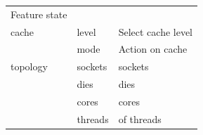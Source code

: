 \documentclass[
  14pt,
  english,
  a4paper,
]{scrreprt}
\begin{document}
\begin{longtable}[]{@{}lll@{}}
\begin{minipage}[t]{0.27\columnwidth}
Feature state\strut
\end{minipage}\tabularnewline
\begin{minipage}[t]{0.16\columnwidth}\raggedright
cache\strut
\end{minipage} & \begin{minipage}[t]{0.15\columnwidth}\raggedright
level\strut
\end{minipage} & \begin{minipage}[t]{0.27\columnwidth}\raggedright
Select cache level\strut
\end{minipage}\tabularnewline
\begin{minipage}[t]{0.16\columnwidth}\raggedright
\strut
\end{minipage} & \begin{minipage}[t]{0.15\columnwidth}\raggedright
mode\strut
\end{minipage} & \begin{minipage}[t]{0.27\columnwidth}\raggedright
Action on cache\strut
\end{minipage}\tabularnewline
\begin{minipage}[t]{0.16\columnwidth}\raggedright
topology\strut
\end{minipage} & \begin{minipage}[t]{0.15\columnwidth}\raggedright
sockets\strut
\end{minipage} & \begin{minipage}[t]{0.27\columnwidth}\raggedright
sockets\strut
\end{minipage}\tabularnewline
\begin{minipage}[t]{0.16\columnwidth}\raggedright
\strut
\end{minipage} & \begin{minipage}[t]{0.15\columnwidth}\raggedright
dies\strut
\end{minipage} & \begin{minipage}[t]{0.27\columnwidth}\raggedright
dies\strut
\end{minipage}\tabularnewline
\begin{minipage}[t]{0.16\columnwidth}\raggedright
\strut
\end{minipage} & \begin{minipage}[t]{0.15\columnwidth}\raggedright
cores\strut
\end{minipage} & \begin{minipage}[t]{0.27\columnwidth}\raggedright
cores\strut
\end{minipage}\tabularnewline
\begin{minipage}[t]{0.16\columnwidth}\raggedright
\strut
\end{minipage} & \begin{minipage}[t]{0.15\columnwidth}\raggedright
threads\strut
\end{minipage} & \begin{minipage}[t]{0.27\columnwidth}\raggedright
of threads\strut
\end{minipage}\tabularnewline
\bottomrule
\end{longtable}
\end{document}
